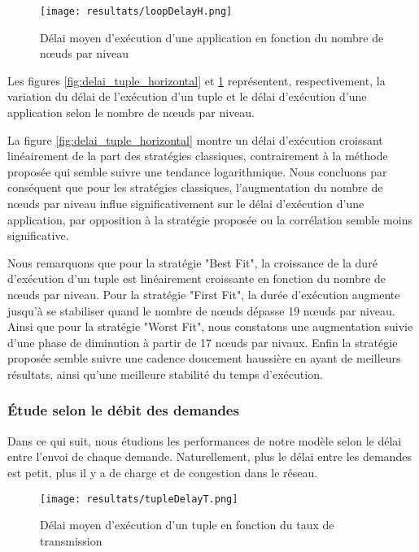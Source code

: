 \begin{figure}[H]
  \centering
  \texttt{[image: resultats/loopDelayH.png]}
  \caption{Délai moyen d'exécution d'une application en fonction du nombre de nœuds par niveau}
  \label{fig:delai_application_horizontal}
\end{figure}

Les figures \ref{fig:delai_tuple_horizontal} et \ref{fig:delai_application_horizontal} représentent, respectivement, la variation du délai de l'exécution d'un tuple et le délai d'exécution d'une application selon le nombre de nœuds par niveau.\par
La figure \ref{fig:delai_tuple_horizontal} montre un délai d'exécution croissant linéairement de la part des stratégies classiques, contrairement à la méthode proposée qui semble suivre une tendance logarithmique. Nous concluons par conséquent que pour les stratégies classiques, l'augmentation du nombre de nœuds par niveau influe significativement sur le délai d'exécution d'une application, par opposition à la stratégie proposée ou la corrélation semble moins significative.\par
Nous remarquons que pour la stratégie "Best Fit", la croissance de la duré d'exécution d'un tuple est linéairement croissante en fonction du nombre de nœuds par niveau. Pour la stratégie "First Fit", la durée d'exécution augmente jusqu'à se stabiliser quand le nombre de nœuds dépasse 19 nœuds par niveau. Ainsi que pour la stratégie "Worst Fit", nous constatons une augmentation suivie d'une phase de diminution à partir de 17 nœuds par nivaux. Enfin la stratégie proposée semble suivre une cadence doucement haussière en ayant de meilleurs résultats, ainsi qu'une meilleure stabilité du temps d'exécution.

\subsubsection{Étude selon le débit des demandes}
Dans ce qui suit, nous étudions les performances de notre modèle selon le délai entre l'envoi de chaque demande. Naturellement, plus le délai entre les demandes est petit, plus il y a de charge et de congestion dans le réseau.

\begin{figure}[H]
  \centering
  \texttt{[image: resultats/tupleDelayT.png]}
  \caption{Délai moyen d'exécution d'un tuple en fonction du taux de transmission}
  \label{fig:delai_tuple_debit}
\end{figure}

